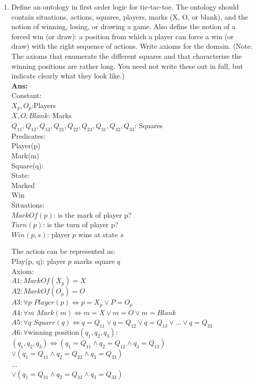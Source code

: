 \documentclass[12pt]{article}
\begin{document}
\begin{enumerate}
\item{Define an ontology in first order logic for tic-tac-toe. The ontology should contain situations, actions, squares, players, marks (X, O, or blank), and the notion of winning, losing, or drawing a game. Also define the notion of a forced win (or draw): a position from which a player can force a win (or draw) with the right sequence of actions. Write axioms for the domain. (Note: The axioms that enumerate the different squares and that characterize the winning positions are rather long. You need not write these out in full, but indicate clearly what they look like.)}\\
\textbf{Ans:}\\
Constant:\\
$X_p, O_p$:Players\\
$X, O, Blank$: Marks\\
$Q_{11}, Q_{12}, Q_{13}, Q_{21}, Q_{22}, Q_{23}, Q_{31}, Q_{32}, Q_{33}$: Squares\\

Predicates:\\
Player(p)\\
Mark(m)\\
Square(q):\\

State:\\
Marked\\
Win\\

Situations:\\
$MarkOf(p)$: is the mark of player p?\\
$Turn(p)$: is the turn of player p?\\
$Win(p, s)$: player $p$ wins at state $s$

The action can be represented as:\\
Play(p, q): player $p$ marks square $q$\\

Axiom:\\
$A1: MarkOf(X_p) = X$\\
$A2: MarkOf(O_p) = O$\\
$A3: \forall p$ $Player(p) \iff p = X_p \lor P = O_p$\\
$A4: \forall m$ $Mark(m) \iff m = X \lor m = O \lor m = Blank$\\
$A5: \forall q$ $Square(q) \iff q=Q_{11} \lor q = Q_{12} \lor q=Q_{13} \lor ...\lor q = Q_{33}$\\
$A6: \forall \text{winning position} (q_1, q_2, q_3):$\\
$(q_1, q_2, q_3) \iff (q_1 = Q_{11} \land q_2 = Q_{12} \land q_3 = Q_{13})$\\
$\lor (q_1 = Q_{11} \land q_2 = Q_{22} \land q_3 = Q_{33})$\\
...\\
$\lor (q_1 = Q_{31} \land q_2 = Q_{32} \land q_3 = Q_{33})$



\end{enumerate}
\end{document}
